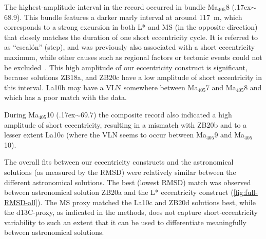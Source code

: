 \documentclass[draft]{agujournal2019}
\newcommand{\appr}{\raise.17ex\hbox{\(\scriptstyle\sim\)}} %
\newcommand{\ma}[1]{Ma\(_{405}\)#1} %
\begin{document}
The highest-amplitude interval in the record occurred in bundle \ma{8} (\appr\qty{68.9}{\millionyearago}).
This bundle features a darker marly interval at around \qty{117}{\metre}, which corresponds to a strong excursion in both \gls{L*} and \gls{MS} (in the opposite direction) that closely matches the duration of one short eccentricity cycle.
It is referred to as ``escal\'{o}n'' (step), and was previously also associated with a short eccentricity maximum, while other causes such as regional factors or tectonic events could not be excluded~\cite{Dinares-Turell2013}.
This high amplitude of our eccentricity construct is significant, because solutions ZB18a, and ZB20c have a low amplitude of short eccentricity in this interval.
La10b may have a \gls{VLN} somewhere between \ma{7} and \ma{8} and which has a poor match with the data.

During \ma{10} (\appr\qty{69.7}{\millionyearago}) the composite record also indicated a high amplitude of short eccentricity, resulting in a mismatch with ZB20b and to a lesser extent La10c (where the \gls{VLN} seems to occur between \ma{9} and \ma{10}).

The overall fits between our eccentricity constructs and the astronomical solutions (as measured by the \gls{RMSD}) were relatively similar between the different astronomical solutions.
The best (lowest \gls{RMSD}) match was observed between astronomical solution ZB20a and the \gls{L*} eccentricity construct (\cref{fig:full-RMSD-all}).
The \gls{MS} proxy matched the La10c and ZB20d solutions best, while
the \gls{d13C}-proxy, as indicated in the methods, does not capture short-eccentricity variability to such an extent that it can be used to differentiate meaningfully between astronomical solutions.
\end{document}
